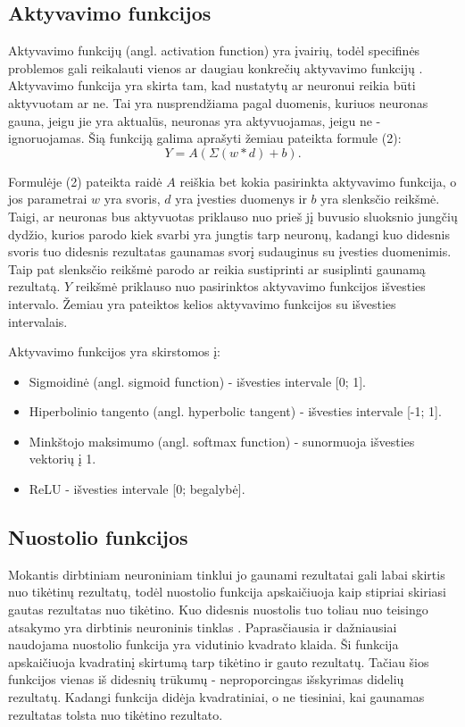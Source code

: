 \documentclass{VUMIFPSkursinis}
\begin{document}
\subsection{Aktyvavimo funkcijos}
Aktyvavimo funkcijų (angl. activation function) yra įvairių, todėl specifinės problemos gali reikalauti vienos ar daugiau konkrečių aktyvavimo funkcijų \cite{activation}.
Aktyvavimo funkcija yra skirta tam, kad nustatytų ar neuronui reikia būti aktyvuotam ar ne. Tai yra nusprendžiama pagal duomenis, kuriuos neuronas gauna, jeigu jie yra aktualūs, neuronas yra aktyvuojamas, jeigu ne - ignoruojamas.
Šią funkciją galima aprašyti žemiau pateikta formule (2):
\begin{equation}
Y = A(\Sigma{(w * d) + b}).
\end{equation}

Formulėje (2) pateikta raidė \(A\) reiškia bet kokia pasirinkta aktyvavimo funkcija, o jos parametrai \(w\) yra svoris, \(d\) yra įvesties duomenys ir \(b\) yra slenksčio reikšmė. Taigi, ar neuronas bus aktyvuotas priklauso nuo prieš jį 
buvusio sluoksnio jungčių dydžio, kurios parodo kiek svarbi yra jungtis tarp neuronų, kadangi kuo didesnis svoris tuo didesnis rezultatas gaunamas svorį sudauginus su įvesties duomenimis. Taip pat slenksčio reikšmė parodo ar reikia 
sustiprinti ar susiplinti gaunamą rezultatą. \(Y\) reikšmė priklauso nuo pasirinktos aktyvavimo funkcijos išvesties intervalo. Žemiau yra pateiktos kelios aktyvavimo funkcijos su išvesties intervalais.  

Aktyvavimo funkcijos yra skirstomos į:
\begin{itemize}
\item Sigmoidinė (angl. sigmoid function) - išvesties intervale [0; 1].
\item Hiperbolinio tangento (angl. hyperbolic tangent) - išvesties intervale [-1; 1].
\item Minkštojo maksimumo (angl. softmax function) - sunormuoja išvesties vektorių į 1.
\item ReLU - išvesties intervale [0; begalybė].
\end{itemize}

\subsection{Nuostolio funkcijos}
Mokantis dirbtiniam neuroniniam tinklui jo gaunami rezultatai gali labai skirtis nuo tikėtinų rezultatų, todėl nuostolio funkcija apskaičiuoja kaip stipriai
skiriasi gautas rezultatas nuo tikėtino. Kuo didesnis nuostolis tuo toliau nuo teisingo atsakymo yra dirbtinis neuroninis tinklas \cite{Cameron-loss-fun}.
Paprasčiausia ir dažniausiai naudojama nuostolio funkcija yra vidutinio kvadrato klaida. Ši funkcija apskaičiuoja kvadratinį skirtumą tarp tikėtino 
ir gauto rezultatų. Tačiau šios funkcijos vienas iš didesnių trūkumų - neproporcingas išskyrimas didelių rezultatų. Kadangi funkcija didėja kvadratiniai,
o ne tiesiniai, kai gaunamas rezultatas tolsta nuo tikėtino rezultato.
\end{document}
